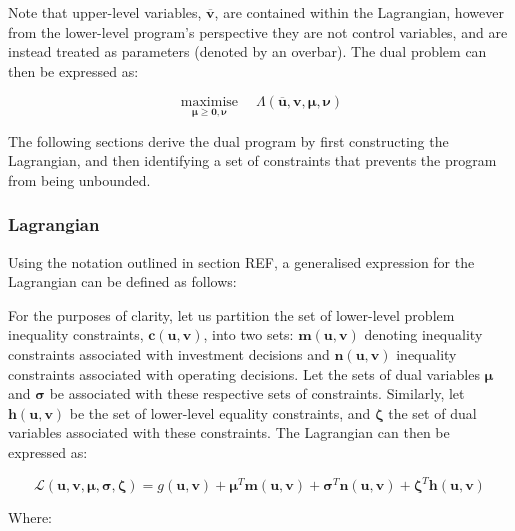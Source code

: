 \documentclass{article}
\DeclareMathOperator*{\maximise}{maximise}
\begin{document}
Note that upper-level variables, $\bm{\overline{v}}$, are contained within the Lagrangian, however from the lower-level program's perspective they are not control variables, and are instead treated as parameters (denoted by an overbar). The dual problem can then be expressed as:

\begin{equation}
\maximise\limits_{\bm{\mu}\geq \bm{0}, \bm{\nu}} \quad \Lambda(\bm{\overline{u}}, \bm{v}, \bm{\mu}, \bm{\nu})
\end{equation}

The following sections derive the dual program by first constructing the Lagrangian, and then identifying a set of constraints that prevents the program from being unbounded.

\subsubsection{Lagrangian}
Using the notation outlined in section REF, a generalised expression for the Lagrangian can be defined as follows:

For the purposes of clarity, let us partition the set of lower-level problem inequality constraints, $\bm{c}(\bm{u}, \bm{v})$, into two sets: $\bm{m}(\bm{u}, \bm{v})$ denoting inequality constraints associated with investment decisions and $\bm{n}(\bm{u}, \bm{v})$ inequality constraints associated with operating decisions. Let the sets of dual variables $\bm{\mu}$ and $\bm{\sigma}$ be associated with these respective sets of constraints. Similarly, let $\bm{h}(\bm{u}, \bm{v})$ be the set of lower-level equality constraints, and $\bm{\zeta}$ the set of dual variables associated with these constraints. The Lagrangian can then be expressed as:

\begin{equation}
	\mathcal{L}(\bm{u}, \bm{v}, \bm{\mu}, \bm{\sigma}, \bm{\zeta}) = g(\bm{u}, \bm{v}) + \bm{\mu}^{T}\bm{m}(\bm{u}, \bm{v}) + \bm{\sigma}^{T}\bm{n}(\bm{u}, \bm{v}) + \bm{\zeta}^{T}\bm{h}(\bm{u}, \bm{v})
\end{equation}

Where:
\end{document}
